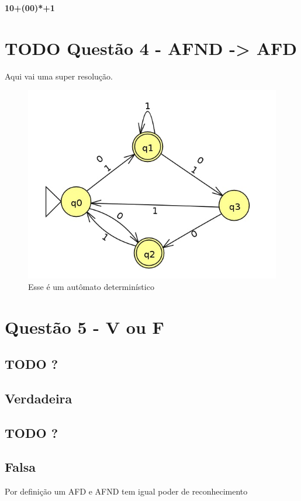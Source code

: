 \documentclass[11pt]{article}
\begin{document}
\textbf{10+(00)*+1} 
\section{{\bfseries\sffamily TODO} Questão 4 - AFND -> AFD}
\label{sec:org28e1318}
Aqui vai uma super resolução.
\begin{figure}[htbp]
\centering
\includegraphics[width=.9\linewidth]{./q4/q4.jpg}
\caption{\label{fig:org462c7aa}
Esse é um autômato determinístico}
\end{figure}
\section{Questão 5  - V ou F}
\label{sec:orga392800}
\subsection{{\bfseries\sffamily TODO} ?}
\label{sec:orgab895dd}
\subsection{Verdadeira}
\label{sec:orgff1e330}
\subsection{{\bfseries\sffamily TODO} ?}
\label{sec:orgb4ec6db}
\subsection{Falsa}
\label{sec:org55c3e8a}
Por definição um AFD e AFND tem igual poder de reconhecimento
\end{document}
